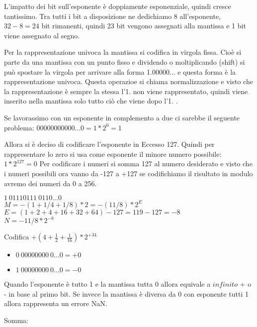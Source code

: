 \documentclass[a4paper]{article}
\theoremstyle{break}
\theoremstyle{break}
\theoremstyle{break}
\theoremstyle{break}
\theoremstyle{break}
\begin{document}
L'impatto dei bit sull'esponente è doppiamente esponenziale, quindi cresce tantissimo.
Tra tutti i bit a disposizione ne dedichiamo 8 all'esponente, $32 - 8 = 24$ bit rimanenti,
quindi 23 bit vengono assegnati alla mantissa e 1 bit viene assegnato al segno.
\label{fig:disegno1}

Per la rappresentazione univoca la mantissa si codifica in virgola fissa.
Cioè si parte da una mantissa con un punto fisso e dividendo o moltiplicando (shift) si
può spostare la virgola per arrivare alla forma 1.00000... e questa forma è la
rappresentazione univoca. Questa operazioe si chiama normalizzazione e visto che la
rappresentazione è sempre la stessa l'1. non viene rappresentato, quindi
viene inserito nella mantissa solo tutto ciò che viene dopo l'1. .
\label{fig:disegno2}

Se lavorassimo con un esponente in complemento a due ci sarebbe il seguente problema:
$00000000000...0 = 1*2^{0}=1$

Allora si è deciso di codificare l'esponente in Eccesso 127. Quindi per rappresentare
lo zero si usa come esponente il minore numero possibile: $1*2^{127} = 0$
Per codificare i numeri si somma 127 al numero desiderato e visto che i numeri possibili
ora vanno da -127 a +127 se codifichiamo il risultato in modulo avremo dei numeri
da 0 a 256.

\begin{example}
	$1\:01110111\:0110...0$\\
	$M = -(1+1/4+1/8)*2 = -(11/8)*2^{E}$\\
	$E = (1+2+4+16+32+64)-127=119-127=-8$\\
	$N = -11/8 * 2^{-8}$
\end{example}
\begin{exercise}
	Codifica $+(4+\frac{1}{2}+\frac{1}{16})*2^{+34}$
\end{exercise}

\begin{itemize}
	\item $0\:00000000\:0...0 = +0$
	\item $1\:00000000\:0...0 = -0$
\end{itemize}

Quando l'esponente è tutto 1 e la mantissa tutta 0 allora equivale a $infinito$
+ o - in base al primo bit. Se invece la mantissa è diversa da 0 con esponente tutti 1
allora rappresenta un errore NaN.

Somma:\\
\label{es2}
\end{document}
